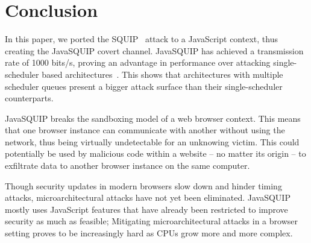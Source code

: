 \documentclass[11pt,
  titlepage=false,
]{scrreprt}
\begin{document}
\chapter{Conclusion}
\label{ch:conclusion}
In this paper, we ported the SQUIP~\cite{squip} attack to a JavaScript context, thus creating the JavaSQUIP covert channel.
JavaSQUIP has achieved a transmission rate of 1000 bits/s, proving an advantage in performance over attacking single-scheduler based architectures~\cite{Rokicki2022webport}.
This shows that architectures with multiple scheduler queues present a bigger attack surface than their single-scheduler counterparts.

JavaSQUIP breaks the sandboxing model of a web browser context.
This means that one browser instance can communicate with another without using the network, thus being virtually undetectable for an unknowing victim.
This could potentially be used by malicious code within a website -- no matter its origin -- to exfiltrate data to another browser instance on the same computer.

Though security updates in modern browsers slow down and hinder timing attacks, microarchitectural attacks have not yet been eliminated.
JavaSQUIP mostly uses JavaScript features that have already been restricted to improve security as much as feasible;
Mitigating microarchitectural attacks in a browser setting proves to be increasingly hard as CPUs grow more and more complex.



\printbibliography
\end{document}
